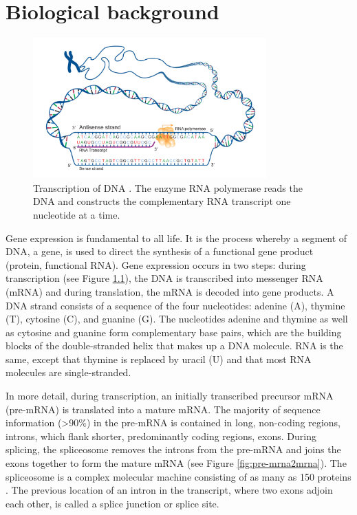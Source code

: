 \chapter{\label{ch:2-litreview}Biological background} %

\begin{figure}[h]
	\centering\includegraphics[width=0.8\textwidth]{../visualizations/ch2-biobackground/transcription.jpg} 
	\caption
	{Transcription of DNA \cite{img:transcription}. The enzyme RNA polymerase reads the DNA and constructs the complementary RNA transcript one nucleotide at a time. 
	}
	\label{fig:transcription}
\end{figure}


Gene expression is fundamental to all life. It is the process whereby a segment of DNA, a gene, is used to direct the synthesis of a functional gene product (protein, functional RNA). Gene expression occurs in two steps: during transcription (see Figure \ref{fig:transcription}), the DNA is transcribed into messenger RNA (mRNA) and during translation, the mRNA is decoded into gene products. A DNA strand consists of a sequence of the four nucleotides: adenine (A), thymine (T), cytosine (C), and guanine (G). The nucleotides adenine and thymine as well as cytosine and guanine form complementary base pairs, which are the building blocks of the double-stranded helix that makes up a DNA molecule. RNA is the same, except that thymine is replaced by uracil (U) and that most RNA molecules are single-stranded.


In more detail, during transcription, an initially transcribed precursor mRNA (pre-mRNA) is translated into a mature mRNA. 
The majority of sequence information (>90\%) in the pre-mRNA is contained in long, non-coding regions, introns, which flank shorter, predominantly coding regions, exons. 
During splicing, the spliceosome removes the introns from the pre-mRNA and joins the exons together to form the mature mRNA (see Figure \ref{fig:pre-mrna2mrna}). The spliceosome is a complex molecular machine consisting of as many as 150 proteins \cite{splicing_current_perspectives}. The previous location of an intron in the transcript, where two exons adjoin each other, is called a splice junction or splice site.


